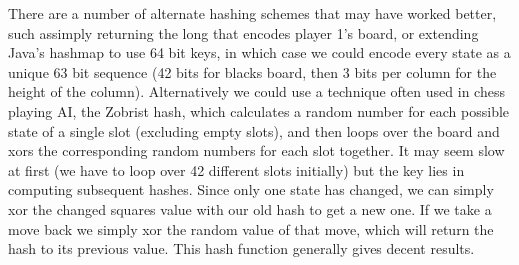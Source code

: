 \documentclass{article}
\begin{document}
There are a number of alternate hashing schemes that may have worked better, such assimply returning the long that encodes player 1's board, or extending Java's hashmap to use 64 bit keys, in which case we could encode every state as a unique 63 bit sequence (42 bits for blacks board, then 3 bits per column for the height of the column). Alternatively we could use a technique often used in chess playing AI, the Zobrist hash, which calculates a random number for each possible state of a single slot (excluding empty slots), and then loops over the board and xors the corresponding random numbers for each slot together. It may seem slow at first (we have to loop over 42 different slots initially) but the key lies in computing subsequent hashes. Since only one state has changed, we can simply xor the changed squares value with our old hash to get a new one. If we take a move back we simply xor the random value of that move, which will return the hash to its previous value. This hash function generally gives decent results.
\end{document}
